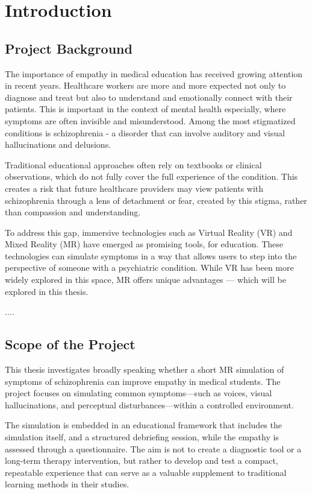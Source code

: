 \chapter{Introduction}
\label{ch:introduction}


\section{Project Background}

The importance of empathy in medical education has received growing attention in recent years. Healthcare workers are more and more expected not only to diagnose and treat but also to understand and emotionally connect with their patients. This is important in the context of mental health especially, where symptoms are often invisible and misunderstood. Among the most stigmatized conditions is schizophrenia - a disorder that can involve auditory and visual hallucinations and delusions.

Traditional educational approaches often rely on textbooks or clinical observations, which do not fully cover the full experience of the condition. This creates a risk that future healthcare providers may view patients with schizophrenia through a lens of detachment or fear, created by this stigma, rather than compassion and understanding.

To address this gap, immersive technologies such as Virtual Reality (VR) and Mixed Reality (MR) have emerged as promising tools, for education. These technologies can simulate symptoms in a way that allows users to step into the perspective of someone with a psychiatric condition. While VR has been more widely explored in this space, MR offers unique advantages — which will be explored in this thesis.

.... 

\section{Scope of the Project}

This thesis investigates broadly speaking whether a short MR simulation of symptoms of schizophrenia can improve empathy in medical students. The project focuses on simulating common symptoms—such as voices, visual hallucinations, and perceptual disturbances—within a controlled environment.

The simulation is embedded in an educational framework that includes the simulation itself, and a structured debriefing session, while the empathy is assessed through a questionnaire. The aim is not to create a diagnostic tool or a long-term therapy intervention, but rather to develop and test a compact, repeatable experience that can serve as a valuable supplement to traditional learning methods in their studies.

